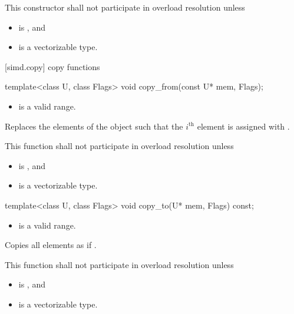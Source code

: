 \begin{wgText}
\begin{itemdescr}
  \pnum\remarks
  This constructor shall not participate in overload resolution unless
  \begin{itemize}
    \item {} is , and
    \item {} is a vectorizable type.
  \end{itemize}
\end{itemdescr}

[simd.copy]{ copy functions}

\begin{itemdecl}
template<class U, class Flags> void copy_from(const U* mem, Flags);
\end{itemdecl}

\begin{itemdescr}
  \pnum\requires
  \begin{itemize}
    \item \tcode{[mem, mem + size())} is a valid range.
  \end{itemize}

  \pnum\effects
  Replaces the elements of the  object such that the $i^\text{th}$ element is assigned with  \foralli.

  \pnum\remarks
  This function shall not participate in overload resolution unless
  \begin{itemize}
    \item {} is , and
    \item {} is a vectorizable type.
  \end{itemize}
\end{itemdescr}

\begin{itemdecl}
template<class U, class Flags> void copy_to(U* mem, Flags) const;
\end{itemdecl}

\begin{itemdescr}
  \pnum\requires
  \begin{itemize}
    \item \tcode{[mem, mem + size())} is a valid range.
  \end{itemize}

  \pnum\effects
  Copies all  elements as if  \foralli.

  \pnum\remarks
  This function shall not participate in overload resolution unless
  \begin{itemize}
    \item {} is , and
    \item {} is a vectorizable type.
  \end{itemize}
\end{itemdescr}


\end{wgText}
